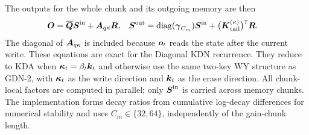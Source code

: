 \documentclass[11pt,letterpaper,logo]{yalearxiv}
\begin{document}
The outputs for the whole chunk and its outgoing memory are then
\begin{equation}
\begin{aligned}
  \boldsymbol{O}
  &=\overline{\boldsymbol{Q}}\boldsymbol{S}^{\mathrm{in}}+\boldsymbol{A}_{q\kappa}\boldsymbol{R},
  &
  \boldsymbol{S}^{\mathrm{out}}
  &=\operatorname{diag}(\boldsymbol{\gamma}_{C_m})\boldsymbol{S}^{\mathrm{in}}
    +\bigl(\boldsymbol{K}_{\mathrm{tail}}^{(\kappa)}\bigr)^{\intercal}\boldsymbol{R}.
\end{aligned}
  \label{eq:chunk-memory-output-state}
\end{equation}
The diagonal of $\boldsymbol{A}_{q\kappa}$ is included because $\boldsymbol{o}_t$ reads the state after the
current write. These equations are exact for the Diagonal KDN recurrence. They reduce to KDA when
$\boldsymbol{\kappa}_t=\beta_t\boldsymbol{k}_t$ and otherwise use the same two-key WY structure as GDN-2, with
$\boldsymbol{\kappa}_t$ as the write direction and $\boldsymbol{k}_t$ as the erase direction. All chunk-local
factors are computed in parallel; only $\boldsymbol{S}^{\mathrm{in}}$ is carried across memory chunks.
The implementation forms decay ratios from cumulative log-decay differences for numerical
stability and uses $C_m\in\{32,64\}$, independently of the gain-chunk length.




\end{document}
